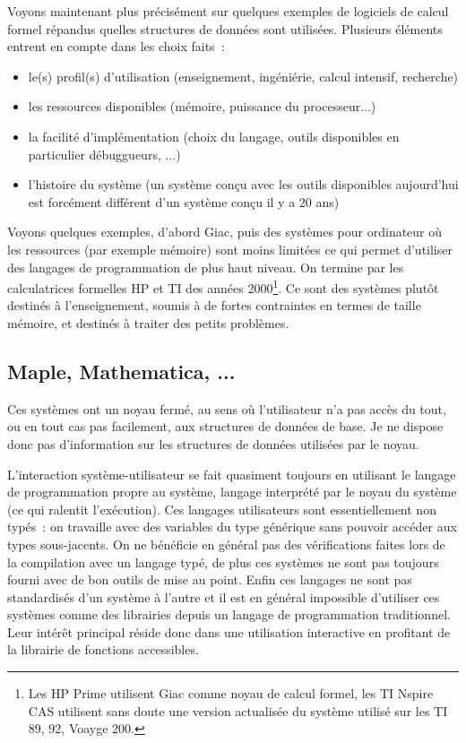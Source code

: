 \documentclass[a4paper,11pt]{book}
\begin{document}
\begin{giacjshere}
Voyons maintenant plus précisément sur quelques exemples de logiciels
de calcul formel r\'epandus quelles structures de données sont
utilisées. Plusieurs \'el\'ements entrent en compte dans les choix faits~:
\begin{itemize}
\item le(s) profil(s) d'utilisation (enseignement, ing\'eni\'erie,
calcul intensif, recherche)
\item les ressources disponibles (m\'emoire, puissance du processeur...)
\item la facilit\'e d'impl\'ementation (choix du langage, outils
disponibles en particulier d\'ebuggueurs, ...)
\item l'histoire du syst\`eme (un syst\`eme conçu avec les outils
disponibles aujourd'hui est forc\'ement diff\'erent d'un syst\`eme 
conçu il y a 20 ans)
\end{itemize}
Voyons quelques exemples, d'abord Giac, puis des syst\`emes 
pour ordinateur où les ressources
(par exemple m\'emoire) sont moins limit\'ees ce qui permet 
d'utiliser des langages de programmation de plus haut niveau.
On termine par les calculatrices formelles
HP et TI des ann\'ees 2000\footnote{Les HP Prime utilisent Giac comme
  noyau de calcul formel, les TI Nspire CAS utilisent sans doute une
  version actualis\'ee du syst\`eme utilis\'e sur les TI 89, 92,
  Voayge 200.}.
Ce sont des systèmes plutôt destinés à l'enseignement, soumis 
\`a de fortes contraintes en termes de taille m\'emoire, et destinés
à traiter des petits problèmes.


\subsection{Maple, Mathematica, ...}
Ces syst\`emes ont un noyau ferm\'e, au sens o\`u l'utilisateur n'a pas
acc\`es du tout, ou en tout cas pas facilement, aux structures de donn\'ees
de base. Je ne dispose donc pas d'information sur les structures de donn\'ees
utilis\'ees par le noyau.

L'interaction système-utilisateur se fait quasiment toujours en utilisant le
langage de programmation propre au syst\`eme, langage interpr\'et\'e
par le noyau du syst\`eme (ce qui ralentit l'exécution). Ces langages 
utilisateurs sont essentiellement
non typ\'es~: on travaille avec des variables du type générique sans pouvoir
accéder aux types sous-jacents. On ne bénéficie en g\'en\'eral pas des
v\'erifications faites lors de la compilation avec un langage typé,
de plus ces systèmes ne sont pas toujours fourni avec de bon outils de 
mise au point. Enfin ces langages ne sont pas standardisés d'un
système à l'autre et il est en général impossible
d'utiliser ces systèmes comme des librairies depuis un langage
de programmation traditionnel. Leur intérêt principal réside donc
dans une utilisation interactive en profitant de la librairie de 
fonctions accessibles.


\end{giacjshere}
\end{document}
